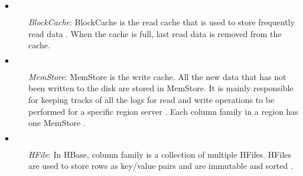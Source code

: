 \documentclass[11pt,a4paper,bibtotoc,idxtotoc,headsepline,footsepline,footexclude,BCOR12mm,DIV13]{scrbook}
\begin{document}
\begin{description}
	\item[$\bullet$]  \emph{BlockCache}: BlockCache is the read cache that is used to store frequently read data \cite{hbase:insights}. When the cache is full, last read data is removed from the cache.
\end{description}

\begin{description}
	\item[$\bullet$] \emph{MemStore}: MemStore is the write cache. All the new data that has not been written to the disk are stored in MemStore. It is mainly responsible for keeping tracks of all the logs for read and write operations to be performed for a specific region server \cite{hbase:architecture}. Each column family in a region has one MemStore \cite{hbase:insights}.
\end{description}

\begin{description}
	\item[$\bullet$] \emph{HFile}: In HBase, column family is a collection of multiple HFiles. HFiles are used to store rows as key/value pairs and are immutable and sorted \cite{hbase:insights}.
\end{description}
\end{document}
